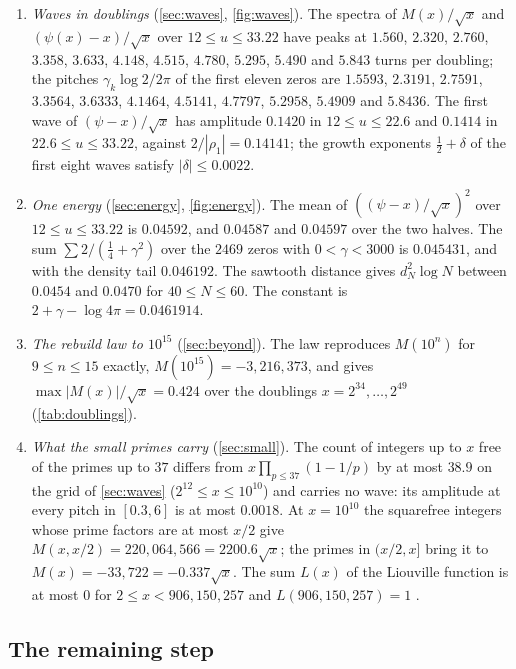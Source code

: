 \documentclass[11pt]{article}
\theoremstyle{definition}\newtheorem{definition}[theorem]{Definition}
\theoremstyle{remark}\newtheorem{remark}[theorem]{Remark}
\begin{document}
\begin{enumerate}[label=(\arabic*)]
\item \emph{Waves in doublings} (\cref{sec:waves}, \cref{fig:waves}). The spectra of $M(x)/\sqrt x$ and $(\psi(x)-x)/\sqrt x$ over $12\le u\le33.22$ have peaks at $1.560$, $2.320$, $2.760$, $3.358$, $3.633$, $4.148$, $4.515$, $4.780$, $5.295$, $5.490$ and $5.843$ turns per doubling; the pitches $\gamma_k\log2/2\pi$ of the first eleven zeros are $1.5593$, $2.3191$, $2.7591$, $3.3564$, $3.6333$, $4.1464$, $4.5141$, $4.7797$, $5.2958$, $5.4909$ and $5.8436$. The first wave of $(\psi-x)/\sqrt x$ has amplitude $0.1420$ in $12\le u\le22.6$ and $0.1414$ in $22.6\le u\le33.22$, against $2/|\rho_1|=0.14141$; the growth exponents $\frac12+\delta$ of the first eight waves satisfy $|\delta|\le0.0022$.
\item \emph{One energy} (\cref{sec:energy}, \cref{fig:energy}). The mean of $((\psi-x)/\sqrt x)^2$ over $12\le u\le33.22$ is $0.04592$, and $0.04587$ and $0.04597$ over the two halves. The sum $\sum2/(\frac14+\gamma^2)$ over the $2469$ zeros with $0<\gamma<3000$ is $0.045431$, and with the density tail $0.046192$. The sawtooth distance gives $d_N^2\log N$ between $0.0454$ and $0.0470$ for $40\le N\le60$. The constant is $2+\gamma-\log4\pi=0.0461914$.
\item \emph{The rebuild law to $10^{15}$} (\cref{sec:beyond}). The law reproduces $M(10^n)$ for $9\le n\le15$ exactly, $M(10^{15})=-3{,}216{,}373$, and gives $\max|M(x)|/\sqrt x=0.424$ over the doublings $x=2^{34},\dots,2^{49}$ (\cref{tab:doublings}).
\item \emph{What the small primes carry} (\cref{sec:small}). The count of integers up to $x$ free of the primes up to $37$ differs from $x\prod_{p\le37}(1-1/p)$ by at most $38.9$ on the grid of \cref{sec:waves} ($2^{12}\le x\le10^{10}$) and carries no wave: its amplitude at every pitch in $[0.3,6]$ is at most $0.0018$. At $x=10^{10}$ the squarefree integers whose prime factors are at most $x/2$ give $M(x,x/2)=220{,}064{,}566=2200.6\sqrt x$; the primes in $(x/2,x]$ bring it to $M(x)=-33{,}722=-0.337\sqrt x$. The sum $L(x)$ of the Liouville function is at most $0$ for $2\le x<906{,}150{,}257$ and $L(906{,}150{,}257)=1$ \cite{Tanaka}.
\end{enumerate}

\subsection{The remaining step}
\end{document}

